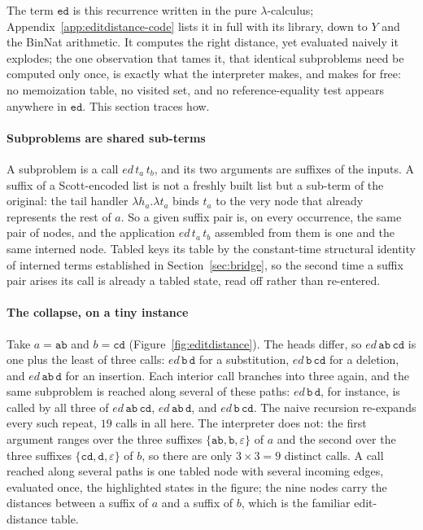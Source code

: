 The term $\mathtt{ed}$ is this recurrence written in the pure $\lambda$-calculus; Appendix~\ref{app:editdistance-code} lists it in full with its library, down to $Y$ and the BinNat arithmetic. It computes the right distance, yet evaluated naively it explodes; the one observation that tames it, that identical subproblems need be computed only once, is exactly what the interpreter makes, and makes for free: no memoization table, no visited set, and no reference-equality test appears anywhere in $\mathtt{ed}$. This section traces how.

\paragraph{Subproblems are shared sub-terms}
A subproblem is a call $\mathit{ed}\,t_a\,t_b$, and its two arguments are suffixes of the inputs. A suffix of a Scott-encoded list is not a freshly built list but a sub-term of the original: the tail handler $\lambda h_a.\lambda t_a$ binds $t_a$ to the very node that already represents the rest of $a$. So a given suffix pair is, on every occurrence, the same pair of nodes, and the application $\mathit{ed}\,t_a\,t_b$ assembled from them is one and the same interned node. \textsf{Tabled} keys its table by the constant-time structural identity of interned terms established in Section~\ref{sec:bridge}, so the second time a suffix pair arises its call is already a tabled state, read off rather than re-entered.

\paragraph{The collapse, on a tiny instance}
Take $a=\mathtt{ab}$ and $b=\mathtt{cd}$ (Figure~\ref{fig:editdistance}). The heads differ, so $\mathit{ed}\,\mathtt{ab}\,\mathtt{cd}$ is one plus the least of three calls: $\mathit{ed}\,\mathtt{b}\,\mathtt{d}$ for a substitution, $\mathit{ed}\,\mathtt{b}\,\mathtt{cd}$ for a deletion, and $\mathit{ed}\,\mathtt{ab}\,\mathtt{d}$ for an insertion. Each interior call branches into three again, and the same subproblem is reached along several of these paths: $\mathit{ed}\,\mathtt{b}\,\mathtt{d}$, for instance, is called by all three of $\mathit{ed}\,\mathtt{ab}\,\mathtt{cd}$, $\mathit{ed}\,\mathtt{ab}\,\mathtt{d}$, and $\mathit{ed}\,\mathtt{b}\,\mathtt{cd}$. The naive recursion re-expands every such repeat, $19$ calls in all here. The interpreter does not: the first argument ranges over the three suffixes $\{\mathtt{ab},\mathtt{b},\varepsilon\}$ of $a$ and the second over the three suffixes $\{\mathtt{cd},\mathtt{d},\varepsilon\}$ of $b$, so there are only $3\times 3=9$ distinct calls. A call reached along several paths is one tabled node with several incoming edges, evaluated once, the highlighted states in the figure; the nine nodes carry the distances between a suffix of $a$ and a suffix of $b$, which is the familiar edit-distance table.

